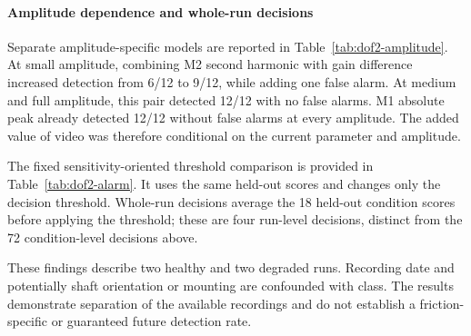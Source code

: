 \paragraph{Amplitude dependence and whole-run decisions}
Separate amplitude-specific models are reported in
Table~\ref{tab:dof2-amplitude}. At small amplitude, combining M2 second
harmonic with gain difference increased detection from 6/12 to 9/12,
while adding one false alarm. At medium and full amplitude, this pair
detected 12/12 with no false alarms. M1 absolute peak already detected
12/12 without false alarms at every amplitude. The added value of video
was therefore conditional on the current parameter and amplitude.

The fixed sensitivity-oriented threshold comparison is provided in
Table~\ref{tab:dof2-alarm}. It uses the same held-out scores and changes
only the decision threshold. Whole-run decisions average the 18 held-out
condition scores before applying the threshold; these are four run-level
decisions, distinct from the 72 condition-level decisions above.

These findings describe two healthy and two degraded runs.
Recording date and potentially shaft orientation or mounting are
confounded with class. The results demonstrate separation of the available
recordings and do not establish a friction-specific or guaranteed future
detection rate.
